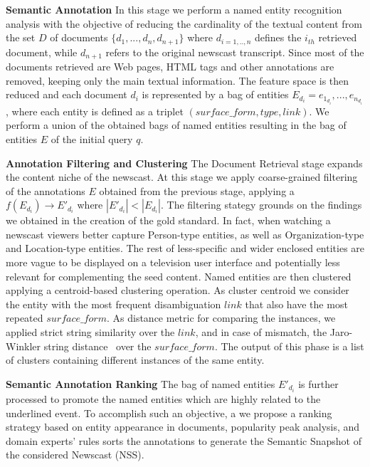 \documentclass{llncs}
\begin{document}
{\bf Semantic Annotation} In this stage we perform a named entity recognition analysis with the objective of reducing the cardinality of the textual content from the set $D$ of documents $\{d_1, ..., d_n, d_{n+1}\}$ where $d_{i=1,..,n}$ defines the $i_{th}$ retrieved document, while $d_{n+1}$ refers to the original newscast transcript. Since most of the documents retrieved are Web pages, HTML tags and other annotations are removed, keeping only the main textual information. The feature space is then reduced and each document $d_i$ is represented by a bag of entities $E_{d_i}={e_{1_{d_i}}, ..., e_{n_{d_i}}}$, where each entity is defined as a triplet $(surface\_form, type, link)$. We perform a union of the obtained bags of named entities resulting in the bag of entities $E$ of the initial query $q$. 

{\bf Annotation Filtering and Clustering} The Document Retrieval stage expands the content niche of the newscast. At this stage we apply coarse-grained filtering of the annotations $E$ obtained from the previous stage, applying a $f\left ( E_{d_i}\right )\rightarrow  E'_{d_i}$ where $\left |E'_{d_i}  \right | < \left |E_{d_i}  \right |$. The filtering stategy grounds on the findings we obtained in the creation of the gold standard. In fact, when watching a newscast viewers better capture Person-type entities, as well as Organization-type and Location-type entities. The rest of less-specific and wider enclosed entities are more vague to be displayed on a television user interface and potentially less relevant for complementing the seed content. 
Named entities are then clustered applying a centroid-based clustering operation. As cluster centroid we consider the entity with the most frequent disambiguation $link$ that also have the most repeated $surface\_form$. As distance metric for comparing the instances, we applied strict string similarity over the $link$, and in case of mismatch, the Jaro-Winkler string distance~\cite{winkler2006overview} over the $surface\_form$. The output of this phase is a list of clusters containing different instances of the same entity.

{\bf Semantic Annotation Ranking}
The bag of named entities $E'_{d_i}$ is further processed to promote the named entities which are highly related to the underlined event. To accomplish such an objective, a we propose a ranking strategy based on entity appearance in documents, popularity peak analysis, and domain experts' rules sorts the annotations to generate the Semantic Snapshot of the considered Newscast (NSS).
\end{document}
